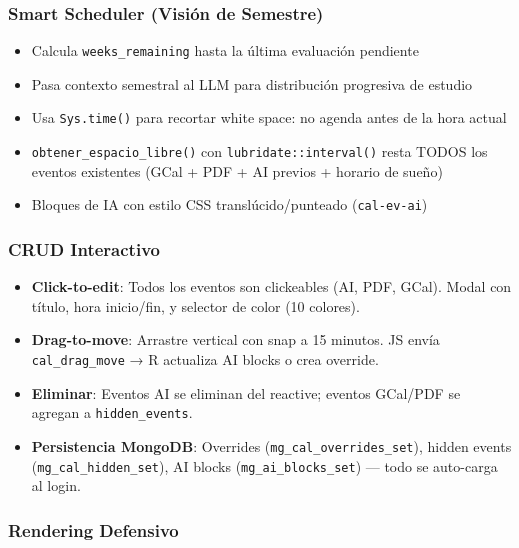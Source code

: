 \documentclass[
  spanish,
  11pt,
  a4paper,
]{article}
\providecommand{\tightlist}{%
  \setlength{\itemsep}{0pt}\setlength{\parskip}{0pt}}
\begin{document}
\subsubsection{Smart Scheduler (Visión de
Semestre)}\label{smart-scheduler-visiuxf3n-de-semestre}

\begin{itemize}
\tightlist
\item
  Calcula \texttt{weeks\_remaining} hasta la última evaluación pendiente
\item
  Pasa contexto semestral al LLM para distribución progresiva de estudio
\item
  Usa \texttt{Sys.time()} para recortar white space: no agenda antes de
  la hora actual
\item
  \texttt{obtener\_espacio\_libre()} con \texttt{lubridate::interval()}
  resta TODOS los eventos existentes (GCal + PDF + AI previos + horario
  de sueño)
\item
  Bloques de IA con estilo CSS translúcido/punteado (\texttt{cal-ev-ai})
\end{itemize}

\subsubsection{CRUD Interactivo}\label{crud-interactivo}

\begin{itemize}
\tightlist
\item
  \textbf{Click-to-edit}: Todos los eventos son clickeables (AI, PDF,
  GCal). Modal con título, hora inicio/fin, y selector de color (10
  colores).
\item
  \textbf{Drag-to-move}: Arrastre vertical con snap a 15 minutos. JS
  envía \texttt{cal\_drag\_move} → R actualiza AI blocks o crea
  override.
\item
  \textbf{Eliminar}: Eventos AI se eliminan del reactive; eventos
  GCal/PDF se agregan a \texttt{hidden\_events}.
\item
  \textbf{Persistencia MongoDB}: Overrides
  (\texttt{mg\_cal\_overrides\_set}), hidden events
  (\texttt{mg\_cal\_hidden\_set}), AI blocks
  (\texttt{mg\_ai\_blocks\_set}) --- todo se auto-carga al login.
\end{itemize}

\subsubsection{Rendering Defensivo}\label{rendering-defensivo}
\end{document}
